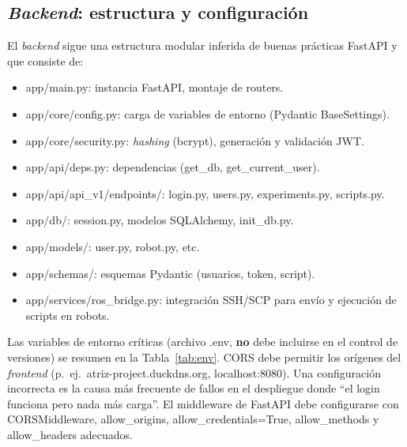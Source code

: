 \documentclass[12pt]{article}
\numberwithin{figure}{section}
\numberwithin{table}{section}
\def\code#1{#1}%
\def\file#1{#1}%
\newcommand{\code}[1]{\textcolor{codeblue}{\url{#1}}}
\newcommand{\file}[1]{\textcolor{darkblue}{\url{#1}}}
\begin{document}
\subsection{\textit{Backend}: estructura y configuración}

El \textit{backend} sigue una estructura modular inferida de buenas prácticas FastAPI y que consiste de:

\begin{itemize}
    \item \file{app/main.py}: instancia FastAPI, montaje de routers.
    \item \file{app/core/config.py}: carga de variables de entorno (Pydantic \code{BaseSettings}).
    \item \file{app/core/security.py}: \textit{hashing} (bcrypt), generación y validación JWT.
    \item \file{app/api/deps.py}: dependencias (\code{get\_db}, \code{get\_current\_user}).
    \item \file{app/api/api\_v1/endpoints/}: \file{login.py}, \file{users.py}, \file{experiments.py}, \file{scripts.py}.
    \item \file{app/db/}: \file{session.py}, modelos SQLAlchemy, \file{init\_db.py}.
    \item \file{app/models/}: \file{user.py}, \file{robot.py}, etc.
    \item \file{app/schemas/}: esquemas Pydantic (usuarios, token, script).
    \item \file{app/services/ros\_bridge.py}: integración SSH/SCP para envío y ejecución de scripts en robots.
\end{itemize}

Las variables de entorno críticas (archivo \file{.env}, \textbf{no} debe incluirse en el control de versiones) se resumen en la Tabla~\ref{tab:env}. CORS debe permitir los orígenes del \textit{frontend} (p.\ ej.\ \code{atriz-project.duckdns.org}, \code{localhost:8080}). Una configuración incorrecta es la causa más frecuente de fallos en el despliegue donde ``el login funciona pero nada más carga''. El middleware de FastAPI debe configurarse con \code{CORSMiddleware}, \code{allow\_origins}, \code{allow\_credentials=True}, \code{allow\_methods} y \code{allow\_headers} adecuados.
\end{document}
